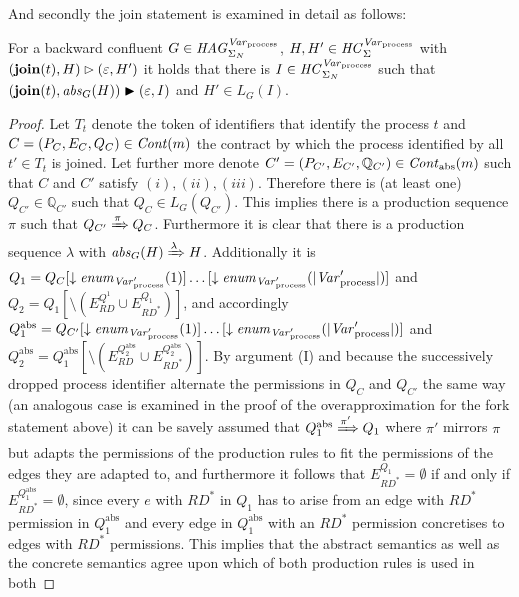 	And secondly the join statement is examined in detail as follows:
	\begin{lemma}
		For a backward confluent $G\in\mathit{HAG}_{\Sigma_{N}}^{\mathit{Var}_{\text{process}}}$, $H,H'\in\mathit{HC}_{\Sigma}^{\mathit{Var}_{\text{process}}}$ with
		$(\text{\textbf{join}}(t),H)\rhd(\varepsilon, H')$
		it holds that there is $I\in\mathit{HC}_{\Sigma_{N}}^{\mathit{Var}_{\text{process}}}$ such that
		$(\text{\textbf{join}}(t),\mathit{abs}_{G}(H))
			\blacktriangleright(\varepsilon,I)$ and $H'\in L_{G}(I)$.
	\end{lemma}
	\begin{proof}
		Let $T_t$ denote the token of identifiers that identify the process $t$
		and $C=(P_{C}, E_{C}, Q_{C})\in\mathit{Cont}(m)$ the contract by which the
		process identified by all $t'\in T_t$ is joined. Let further more denote
		$C'=(P_{C'}, E_{C'}, \mathbb{Q}_{C'})\in\mathit{Cont}_{\text{abs}}(m)$ such that
		$C$ and $C'$ satisfy $(i),(ii),(iii)$. Therefore there is (at least one)
		$Q_{C'}\in\mathbb{Q}_{C'}$ such that $Q_{C}\in L_{G}(Q_{C'})$. This
		implies there is a production sequence $\pi$ such that
		$Q_{C'}\xRightarrow{\pi}Q_{C}$. Furthermore it is clear that there is a
		production sequence $\lambda$ with $\mathit{abs}_{G}(H)\xRightarrow{\lambda}H$.
		Additionally it is $Q_{1}=Q_{C}[\downarrow\mathit{enum}_{\mathit{Var}_{\text{process}}'}(1)]\dots
		[\downarrow\mathit{enum}_{\mathit{Var}_{\text{process}}'}(|\mathit{Var}_{\text{process}}'|)]$ and $Q_{2}=Q_{1}[\setminus
		(E^{Q^{1}}_{\mathit{RD}}\cup E^{Q_{1}}_{\mathit{RD}^{\ast}})]$, and
		accordingly $Q_{1}^{\text{abs}}=Q_{C'}[\downarrow\mathit{enum}_{\mathit{Var}_{\text{process}}'}(1)]\dots
		[\downarrow\mathit{enum}_{\mathit{Var}_{\text{process}}'}(|\mathit{Var}_{\text{process}}'|)]$ and
		$Q_{2}^{\text{abs}}=Q_{1}^{\text{abs}}
		[\setminus(E^{Q_{2}^{\text{abs}}}_{\mathit{RD}}\cup
		E^{Q_{2}^{\text{abs}}}_{\mathit{RD^{\ast}}})]$. By argument (I) and
		because the successively dropped process identifier alternate the
		permissions in $Q_{C}$ and $Q_{C'}$ the same way (an analogous case is
		examined in the proof of the overapproximation for the fork statement
		above) it can be savely assumed that
		$Q_{1}^{\text{abs}}\xRightarrow{\pi'}Q_{1}$ where $\pi'$ mirrors $\pi$
		but adapts the permissions of the production rules to fit the permissions
		of the edges they are adapted to, and furthermore it follows that
		$E^{Q_{1}}_{\mathit{RD}^{\ast}} = \emptyset$ if and
		only if $E^{Q_{1}^{\text{abs}}}_{\mathit{RD}^{\ast}}=\emptyset$, since
		every $e$ with $\mathit{RD}^{\ast}$ in $Q_{1}$ has to arise from an
		edge with $\mathit{RD}^{\ast}$ permission in $Q_{1}^{\text{abs}}$ and
		every edge in $Q_{1}^{\text{abs}}$ with an $\mathit{RD}^{\ast}$
		permission concretises to edges with $\mathit{RD}^{\ast}$ permissions.
		This implies that the abstract semantics as well as the concrete
		semantics agree upon which of both production rules is used in both

\end{proof}
